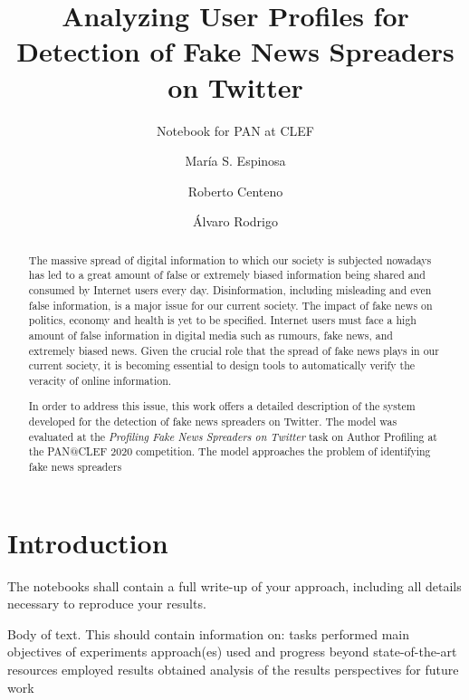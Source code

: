 \documentclass{llncs}
\begin{document}
\title{Analyzing User Profiles for Detection of Fake News Spreaders on Twitter}
\subtitle{Notebook for PAN at CLEF \the\year}

\author{María S. Espinosa \and Roberto Centeno \and Álvaro Rodrigo}

\maketitle

\begin{abstract}
The massive spread of digital information to which our society is subjected nowadays has led to a great amount of false or extremely biased information being shared and consumed by Internet users every day. Disinformation, including misleading and even false information, is a major issue for our current society. The impact of fake news on politics, economy and health is yet to be specified. Internet users must face a high amount of false information in digital media such as rumours, fake news, and extremely biased news. Given the crucial role that the spread of fake news plays in our current society, it is becoming essential to design tools to automatically verify the veracity of online information. 

In order to address this issue, this work offers a detailed description of the system developed for the detection of fake news spreaders on Twitter. The model was evaluated at the \emph{Profiling Fake News Spreaders on Twitter} task on Author Profiling at the PAN@CLEF 2020 competition. The model approaches the problem of identifying fake news spreaders 
\end{abstract}


\section{Introduction}

The notebooks shall contain a full write-up of your approach, including all details necessary to reproduce your results.


Body of text. This should contain information on:  
tasks performed  
main objectives of experiments  
approach(es) used and progress beyond state-of-the-art  
resources employed  
results obtained  
analysis of the results  
perspectives for future work  



\begin{raggedright}

\end{raggedright}
\end{document}
